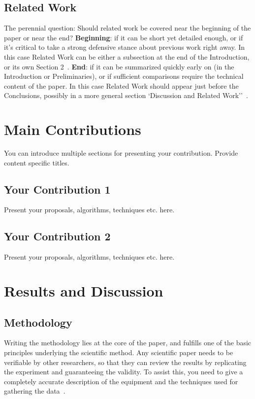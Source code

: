 \documentclass{winslabreport}
\begin{document}
\subsection{Related Work}

The perennial question: Should related work be covered near the beginning of the paper or near the end?
\textbf{Beginning}: if it can be short yet detailed enough, or if it's critical to take a strong defensive stance about previous work right away. In this case Related Work can be either a subsection at the end of the Introduction, or its own Section 2~\cite{Widom2006}. \textbf{End}: if it can be summarized quickly early on (in the Introduction or Preliminaries), or if sufficient comparisons require the technical content of the paper. In this case Related Work should appear just before the Conclusions, possibly in a more general section `Discussion and Related Work''~\cite{Widom2006}.


\section{Main Contributions}

You can introduce multiple sections for presenting your contribution. Provide content specific titles.

\subsection{Your Contribution 1}

Present your proposals, algorithms, techniques etc. here.

\subsection{Your Contribution 2}

Present your proposals, algorithms, techniques etc. here.


\section{Results and Discussion}

\subsection{Methodology}
Writing the methodology lies at the core of the paper, and fulfills one of the basic principles underlying the scientific method. Any scientific paper needs to be verifiable by other researchers, so that they can review the results by replicating the experiment and guaranteeing the validity. To assist this, you need to give a completely accurate description of the equipment and the techniques used for gathering the data~\cite{Shuttleworth2016}.
\end{document}
